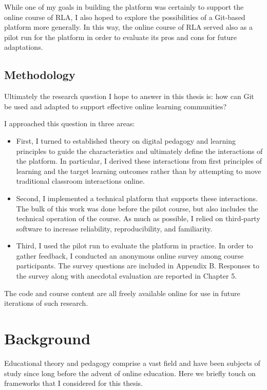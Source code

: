 \documentclass[12pt,twoside]{mitthesis}
\begin{document}
While one of my goals in building the platform was certainly to support the online course of RLA, I also hoped to explore the possibilities of a Git-based platform more generally. In this way, the online course of RLA served also as a pilot run for the platform in order to evaluate its pros and cons for future adaptations. 

\section{Methodology}

Ultimately the research question I hope to answer in this thesis is: how can Git be used and adapted to support effective online learning communities?

I approached this question in three areas:
\begin{itemize}
\item First, I turned to established theory on digital pedagogy and learning principles to guide the characteristics and ultimately define the interactions of the platform. In particular, I derived these interactions from first principles of learning and the target learning outcomes rather than by attempting to move traditional classroom interactions online.
\item Second, I implemented a technical platform that supports these interactions. The bulk of this work was done before the pilot course, but also includes the technical operation of the course. As much as possible, I relied on third-party software to increase reliability, reproducibility, and familiarity.
\item Third, I used the pilot run to evaluate the platform in practice. In order to gather feedback, I conducted an anonymous online survey among course participants. The survey questions are included in Appendix B. Responses to the survey along with anecdotal evaluation are reported in Chapter 5.
\end{itemize}

The code and course content are all freely available online for use in future iterations of such research.~\cite{rla}

\chapter{Background}

Educational theory and pedagogy comprise a vast field and have been subjects of study since long before the advent of online education. Here we briefly touch on frameworks that I considered for this thesis. 
\end{document}
